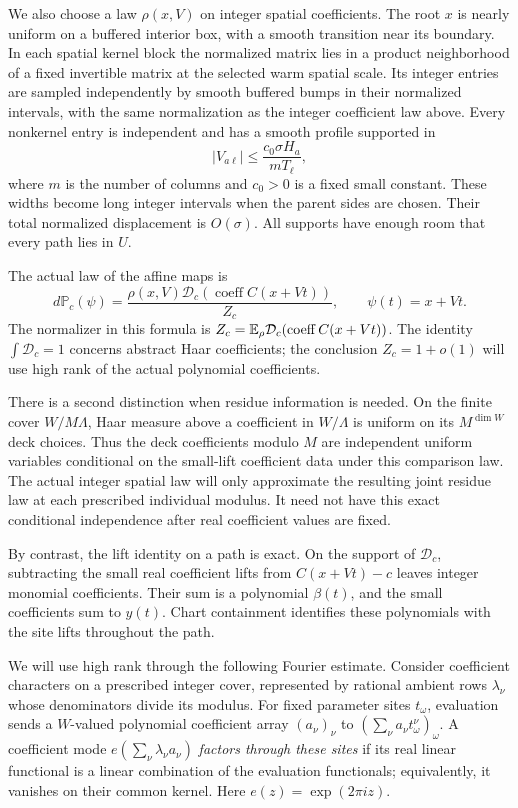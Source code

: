 We also choose a law $\rho(x,V)$ on integer spatial coefficients.
The root $x$ is nearly uniform on a buffered interior box, with
a smooth transition near its boundary. In each spatial kernel
block the normalized matrix lies in a product neighborhood of a
fixed invertible matrix at the selected warm spatial scale.
Its integer entries are sampled independently by smooth buffered
bumps in their normalized intervals, with the same normalization
as the integer coefficient law above. Every nonkernel entry is
independent and has a smooth profile
supported in
\[
             |V_{a\ell}|
             \le \frac{c_0\sigma H_a}{mT_\ell},
\]
where $m$ is the number of columns and $c_0>0$ is a fixed small
constant. These widths become long integer intervals when the
parent sides are chosen. Their total normalized displacement
is $O(\sigma)$. All supports have enough room that every path
lies in $U$.

The actual law of the affine maps is
\begin{equation}\label{ap:path:tilt}
 d\mathbb P_c(\psi)
  =\frac{\rho(x,V)\mathcal D_c(\operatorname{coeff}C(x+Vt))}
  {Z_c},\qquad \psi(t)=x+Vt.
\end{equation}
The normalizer in this formula is
$Z_c=\mathbb E_\rho\mathcal D_c(\operatorname{coeff}C(x+Vt))$.
The identity $\int\mathcal D_c=1$ concerns abstract Haar coefficients;
the conclusion $Z_c=1+o(1)$ will use high rank of the actual
polynomial coefficients.

There is a second distinction when residue information is needed.
On the finite cover $W/M\Lambda$, Haar measure above a coefficient
in $W/\Lambda$ is uniform on its $M^{\dim W}$ deck choices.
Thus the deck coefficients modulo $M$ are independent uniform
variables conditional on the small-lift coefficient data under
this comparison law. The actual integer spatial law will only
approximate the resulting joint residue law at each prescribed
individual modulus. It need not have this exact conditional
independence after real coefficient values are fixed.

By contrast, the lift identity on a path is exact. On the support
of $\mathcal D_c$, subtracting the small real coefficient lifts
from $C(x+Vt)-c$ leaves integer monomial coefficients. Their sum
is a polynomial $\beta(t)$, and the small coefficients sum to
$y(t)$. Chart containment identifies these polynomials with the
site lifts throughout the path.

We will use high rank through the following Fourier estimate.
Consider coefficient characters on a prescribed integer cover,
represented by rational ambient rows $\lambda_\nu$ whose
denominators divide its modulus. For fixed parameter sites
$t_\omega$, evaluation sends a
$W$-valued polynomial coefficient array $(a_\nu)_\nu$ to
$(\sum_\nu a_\nu t_\omega^\nu)_\omega$. A coefficient mode
$e(\sum_\nu\lambda_\nu a_\nu)$ \emph{factors through these sites}
if its real linear functional is a linear combination of the
evaluation functionals; equivalently, it vanishes on their
common kernel. Here $e(z)=\exp(2\pi i z)$.

